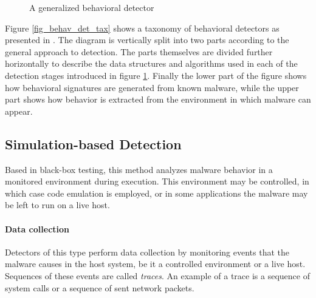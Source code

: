 \begin{figure}[H]
    \centering
    \caption{A generalized behavioral detector}
    \label{fig_gen_behav_detector}
\end{figure}

Figure \ref{fig_behav_det_tax} shows a taxonomy of behavioral detectors as presented in \cite{Jacob08}. The diagram is vertically split into two parts according to the general approach to detection. The parts themselves are divided further horizontally to describe the data structures and algorithms used in each of the detection stages introduced in figure \ref{fig_gen_behav_detector}. Finally the lower part of the figure shows how behavioral signatures are generated from known malware, while the upper part shows how behavior is extracted from the environment in which malware can appear.

\subsection{Simulation-based Detection}
Based in black-box testing, this method analyzes malware behavior in a monitored environment during execution. This environment may be controlled, in which case code emulation is employed, or in some applications the malware may be left to run on a live host.

\paragraph*{Data collection} Detectors of this type perform data collection by monitoring events that the malware causes in the host system, be it a controlled environment or a live host. Sequences of these events are called \emph{traces}. An example of a trace is a sequence of system calls or a sequence of sent network packets.

